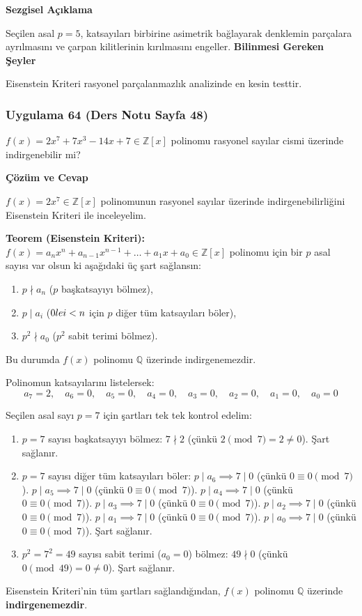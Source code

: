 \documentclass[11pt, a4paper]{article}
\newenvironment{cozum}{
    \vspace{0.5cm}
    \noindent\textcolor{green!60!black}{\faCheckCircle\enspace \textbf{\Large Çözüm ve Cevap}}\par\vspace{0.2cm}
}{}
\newenvironment{sezgisel}{
    \vspace{0.5cm}
    \noindent\textcolor{orange!80!black}{\faLightbulb\enspace \textbf{\Large Sezgisel Açıklama}}\par\vspace{0.2cm}
    \itshape
}{}
\newenvironment{bilgi}{
    \vspace{0.5cm}
    \noindent\textcolor{red!70!black}{\faExclamationTriangle\enspace \textbf{\Large Bilinmesi Gereken Şeyler}}\par\vspace{0.2cm}
}{}
\begin{document}
\begin{sezgisel}
Seçilen asal $p=5$, katsayıları birbirine asimetrik bağlayarak denklemin parçalara ayrılmasını ve çarpan kilitlerinin kırılmasını engeller.
\end{sezgisel}
\begin{bilgi}
Eisenstein Kriteri rasyonel parçalanmazlık analizinde en kesin testtir.
\end{bilgi}

\newpage
\subsubsection{Uygulama 64 (Ders Notu Sayfa 48)}
\begin{sorubox}
$f(x) = 2x^7 + 7x^3 - 14x + 7 \in \mathbb{Z}[x]$ polinomu rasyonel sayılar cismi üzerinde indirgenebilir mi?
\end{sorubox}
\begin{cozum}
$f(x) = 2x^{7} \in \mathbb{Z}[x]$ polinomunun rasyonel sayılar üzerinde indirgenebilirliğini Eisenstein Kriteri ile inceleyelim.

\textbf{Teorem (Eisenstein Kriteri):} $f(x) = a_n x^n + a_{n-1} x^{n-1} + \dots + a_1 x + a_0 \in \mathbb{Z}[x]$ polinomu için bir $p$ asal sayısı var olsun ki aşağıdaki üç şart sağlansın:
\begin{enumerate}
    \item $p \nmid a_n$ ($p$ başkatsayıyı bölmez),
    \item $p \mid a_i$ ($0 \\le i < n$ için $p$ diğer tüm katsayıları böler),
    \item $p^2 \nmid a_0$ ($p^2$ sabit terimi bölmez).
\end{enumerate}
Bu durumda $f(x)$ polinomu $\mathbb{Q}$ üzerinde indirgenemezdir.

Polinomun katsayılarını listelersek:
\[ a_{7} = 2, \quad a_{6} = 0, \quad a_{5} = 0, \quad a_{4} = 0, \quad a_{3} = 0, \quad a_{2} = 0, \quad a_{1} = 0, \quad a_{0} = 0 \]

Seçilen asal sayı $p = 7$ için şartları tek tek kontrol edelim:
\begin{enumerate}
    \item $p = 7$ sayısı başkatsayıyı bölmez: $7 \nmid 2$ (çünkü $2 \pmod{7} = 2 \neq 0$). Şart sağlanır.
    \item $p = 7$ sayısı diğer tüm katsayıları böler:
    $p \mid a_{6} \implies 7 \mid 0$ (çünkü $0 \equiv 0 \pmod{7}$).
    $p \mid a_{5} \implies 7 \mid 0$ (çünkü $0 \equiv 0 \pmod{7}$).
    $p \mid a_{4} \implies 7 \mid 0$ (çünkü $0 \equiv 0 \pmod{7}$).
    $p \mid a_{3} \implies 7 \mid 0$ (çünkü $0 \equiv 0 \pmod{7}$).
    $p \mid a_{2} \implies 7 \mid 0$ (çünkü $0 \equiv 0 \pmod{7}$).
    $p \mid a_{1} \implies 7 \mid 0$ (çünkü $0 \equiv 0 \pmod{7}$).
    $p \mid a_{0} \implies 7 \mid 0$ (çünkü $0 \equiv 0 \pmod{7}$).
    Şart sağlanır.
    \item $p^2 = 7^2 = 49$ sayısı sabit terimi ($a_0 = 0$) bölmez: $49 \nmid 0$ (çünkü $0 \pmod{49} = 0 \neq 0$). Şart sağlanır.
\end{enumerate}

Eisenstein Kriteri'nin tüm şartları sağlandığından, $f(x)$ polinomu $\mathbb{Q}$ üzerinde \textbf{indirgenemezdir}.
\end{cozum}
\end{document}
